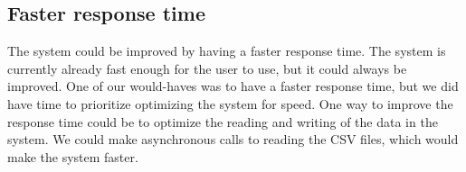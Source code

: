 \subsection{Faster response time}\label{subsec:faster-response-time}

The system could be improved by having a faster response time.
The system is currently already fast enough for the user to use, but it could always be improved.
One of our would-haves was to have a faster response time, but we did have time to prioritize optimizing the system
for speed.
One way to improve the response time could be to optimize the reading and writing of the data in the system.
We could make asynchronous calls to reading the CSV files, which would make the system faster.
